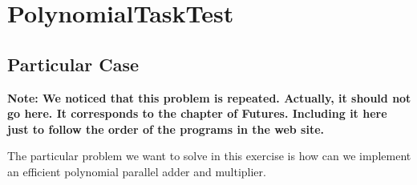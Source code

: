 \section{\textbf{PolynomialTaskTest}}
\subsection{Particular Case}
\par
\textbf{Note: We noticed that this problem is repeated. Actually, it should not
go here. It corresponds to the chapter of Futures. Including it here just to
follow the order of the programs in the web site.}
\par
The particular problem we want to solve in this exercise is how can we implement
an efficient polynomial parallel adder and multiplier.
\par

